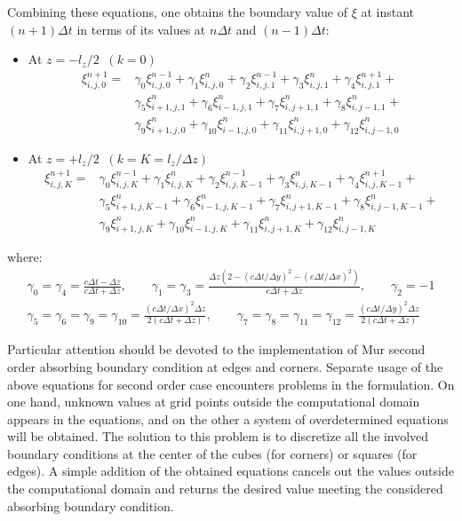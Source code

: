 %
Combining these equations, one obtains the boundary value of $\xi$ at instant $(n+1)\Delta t$ in terms of its values at $n\Delta t$ and $(n-1)\Delta t$:
%
\begin{itemize}
\item At $z=-l_{z}/2 \; \; (k=0)$
\begin{align}
\xi_{i,j,0}^{n+1} = & \gamma_0 \xi_{i,j,0}^{n-1} + \gamma_1 \xi_{i,j,0}^n+ \gamma_2 \xi_{i,j,1}^{n-1} + \gamma_3 \xi_{i,j,1}^n + \gamma_4 \xi_{i,j,1}^{n+1} +
\\ \nonumber
& \gamma_5 \xi_{i+1,j,1}^n + \gamma_6 \xi_{i-1,j,1}^n + \gamma_7 \xi_{i,j+1,1}^n + \gamma_8 \xi_{i,j-1,1}^n +
\\ \nonumber
& \gamma_9 \xi_{i+1,j,0}^n + \gamma_{10} \xi_{i-1,j,0}^n + \gamma_{11} \xi_{i,j+1,0}^n + \gamma_{12} \xi_{i,j-1,0}^n
\end{align}
\item At $z=+l_{z}/2 \; \; (k=K=l_{z}/\Delta z)$
\begin{align}
\xi_{i,j,K}^{n+1} = & \gamma_0 \xi_{i,j,K}^{n-1} + \gamma_1 \xi_{i,j,K}^n+ \gamma_2 \xi_{i,j,K-1}^{n-1} + \gamma_3 \xi_{i,j,K-1}^n + \gamma_4 \xi_{i,j,K-1}^{n+1} +
\\ \nonumber
& \gamma_5 \xi_{i+1,j,K-1}^n + \gamma_6 \xi_{i-1,j,K-1}^n + \gamma_7 \xi_{i,j+1,K-1}^n + \gamma_8 \xi_{i,j-1,K-1}^n +
\\ \nonumber
& \gamma_9 \xi_{i+1,j,K}^n + \gamma_{10} \xi_{i-1,j,K}^n + \gamma_{11} \xi_{i,j+1,K}^n + \gamma_{12} \xi_{i,j-1,K}^n
\end{align}
\end{itemize}
where:
\begin{equation}
\begin{array}{l}
\displaystyle \gamma_0 = \gamma_4 = \frac{c \Delta t - \Delta z}{c \Delta t + \Delta z},
\qquad
\gamma_1 = \gamma_3 = \frac{\Delta z \left( 2 - ( c \Delta t / \Delta y )^2 - (c \Delta t / \Delta x )^2 \right) }{c \Delta t + \Delta z},
\qquad
\gamma_2 = -1 \\
\displaystyle
\gamma_5 = \gamma_6 = \gamma_9 = \gamma_{10} = \frac{(c \Delta t / \Delta x)^2 \Delta z}{2 (c \Delta t + \Delta z) },
\qquad
\gamma_7 = \gamma_8 = \gamma_{11} = \gamma_{12} = \frac{(c \Delta t / \Delta y)^2 \Delta z}{2 (c \Delta t + \Delta z)}
\end{array}
\end{equation}

Particular attention should be devoted to the implementation of Mur second order absorbing boundary condition at edges and corners.
%
Separate usage of the above equations for second order case encounters problems in the formulation.
%
On one hand, unknown values at grid points outside the computational domain appears in the equations, and on the other a system of overdetermined equations will be obtained.
%
The solution to this problem is to discretize all the involved boundary conditions at the center of the cubes (for corners) or squares (for edges).
%
A simple addition of the obtained equations cancels out the values outside the computational domain and returns the desired value meeting the considered absorbing boundary condition.

